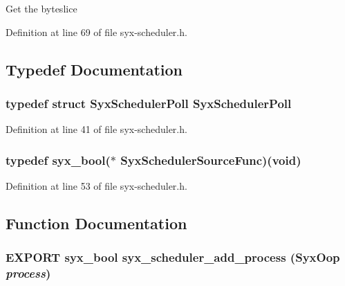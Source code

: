 Get the byteslice 

Definition at line 69 of file syx-scheduler.h.

\subsection{Typedef Documentation}
\hypertarget{syx-scheduler_8h_27742a78647c979f853102fc71347c59}{
\subsubsection{\setlength{\rightskip}{0pt plus 5cm}typedef struct {\bf SyxSchedulerPoll} {\bf SyxSchedulerPoll}}}
\label{syx-scheduler_8h_27742a78647c979f853102fc71347c59}




Definition at line 41 of file syx-scheduler.h.\hypertarget{syx-scheduler_8h_6c2e31a7f026cdd3d5eb1fc0d263c63a}{
\subsubsection{\setlength{\rightskip}{0pt plus 5cm}typedef {\bf syx\_\-bool}($\ast$  {\bf SyxSchedulerSourceFunc})(void)}}
\label{syx-scheduler_8h_6c2e31a7f026cdd3d5eb1fc0d263c63a}




Definition at line 53 of file syx-scheduler.h.

\subsection{Function Documentation}
\hypertarget{syx-scheduler_8h_2fb86e1bdec4b10a406b9da39d671a2d}{
\subsubsection{\setlength{\rightskip}{0pt plus 5cm}EXPORT {\bf syx\_\-bool} syx\_\-scheduler\_\-add\_\-process ({\bf SyxOop} {\em process})}}
\label{syx-scheduler_8h_2fb86e1bdec4b10a406b9da39d671a2d}


